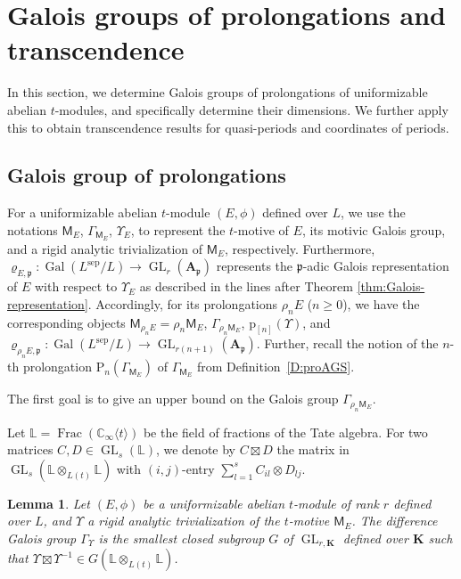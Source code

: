 \documentclass[10pt,a4paper]{amsart}
\theoremstyle{plain} %
\newtheorem{Lemma}[Theorem]{Lemma}
\theoremstyle{definition}
\theoremstyle{remark}
\newcommand{\CC}{\mathbb{C}}
\newcommand{\fp}{\mathfrak{p}}  %
\newcommand{\bA}{\mathbf{A}}
\newcommand{\bK}{\mathbf{K}}
\newcommand{\rP}[1]{\mathrm{P}_{\!#1}}
\newcommand{\Gal}{\operatorname{Gal}}
\newcommand{\GL}{\operatorname{GL}}
\newcommand{\KI}{\mathbb{K}_{\infty}}  %
\newcommand{\CI}{\CC_{\infty}}  %
\newcommand{\cs}[1]{\langle #1 \rangle} %
\newcommand{\mot}{\mathsf{M}}  %
\newcommand{\sep}{\mathrm{sep}}
\newcommand{\prol}[1]{\mathrm{p}_{[#1]}}
\newcommand{\fracTate}{\mathbb{L}}  %
\numberwithin{equation}{subsection}
\begin{document}
\section{Galois groups of prolongations and transcendence}\label{S:Galois groups of prolongations}


In this section, we determine Galois groups of prolongations of uniformizable abelian $t$-modules, and specifically determine their dimensions. We further apply this to obtain transcendence results for quasi-periods and coordinates of periods.

\subsection{Galois group of prolongations}

For a uniformizable abelian $t$-module $(E, \phi)$ defined over $L$, we use the notations $\mot_E$, $\Gamma_{\mot_E}$, $\Upsilon_E$, to represent the $t$-motive of $E$, its motivic Galois group, and a rigid analytic trivialization of $\mot_E$, respectively. Furthermore, $\varrho_{E,\fp}:\Gal(L^\sep/L)\to \GL_r(\bA_\fp)$ represents the $\fp$-adic Galois representation of $E$ with respect to $\Upsilon_E$ as described in the lines after Theorem \ref{thm:Galois-representation}. Accordingly, for its prolongations $\rho_n E$ ($n\geq 0$), we have the corresponding objects 
$\mot_{\rho_n E}=\rho_n\mot_E$, $\Gamma_{\rho_n\mot_E}$, $\prol{n}(\Upsilon)$, and $\varrho_{\rho_nE,\fp}:\Gal(L^\sep/L)\to \GL_{r(n+1)}(\bA_\fp)$. Further, recall the notion of the $n$-th prolongation $\rP{n}(\Gamma_{\mot_E})$ of 
$\Gamma_{\mot_E}$ from Definition~\ref{D:proAGS}.

\medskip

The first goal is to give an upper bound on the Galois group $\Gamma_{\rho_n\mot_E}$.

Let $\fracTate=\operatorname{Frac}(\CI\cs{t})$ be the field of fractions of the Tate algebra. For two matrices $C,D\in \GL_s(\fracTate)$, we denote by $C\boxtimes D$ the matrix in $\GL_s(\fracTate\otimes_{L(t)}\fracTate)$ with $(i,j)$-entry $\sum_{l=1}^s C_{il}\otimes D_{lj}$.


\begin{Lemma}\label{lem:description-of-Gamma-Upsilon}
    Let $(E,\phi)$ be a uniformizable abelian $t$-module of rank $r$ defined over $L$, and $\Upsilon$ a rigid analytic trivialization of the $t$-motive $\mot_E$.
    The difference Galois group $\Gamma_\Upsilon$ is the smallest closed subgroup $G$ of $\GL_{r,\bK}$ defined over $\bK$ such that $\Upsilon\boxtimes \Upsilon^{-1}\in G(\fracTate\otimes_{L(t)} \fracTate)$.
\end{Lemma}
\end{document}
